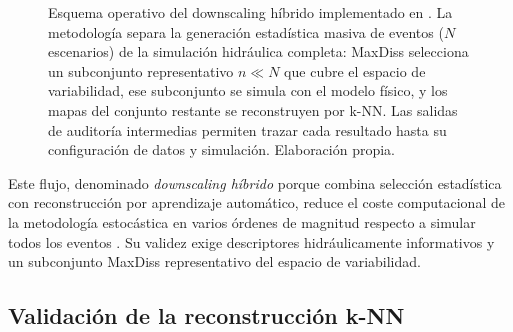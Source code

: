 \begin{figure}[!htbp]
{
}
\caption{Esquema operativo del downscaling híbrido implementado en \hydra. La metodología separa la generación estadística masiva de eventos ($N$ escenarios) de la simulación hidráulica completa: MaxDiss selecciona un subconjunto representativo $n \ll N$ que cubre el espacio de variabilidad, ese subconjunto se simula con el modelo físico, y los mapas del conjunto restante se reconstruyen por k-NN. Las salidas de auditoría intermedias permiten trazar cada resultado hasta su configuración de datos y simulación. Elaboración propia.}
\label{fig:maxdiss_downscaling}
\end{figure}

Este flujo, denominado \emph{downscaling híbrido} porque combina selección estadística con reconstrucción por aprendizaje automático, reduce el coste computacional de la metodología estocástica en varios órdenes de magnitud respecto a simular todos los eventos \parencite{deljesus2024downscaling}. Su validez exige descriptores hidráulicamente informativos y un subconjunto MaxDiss representativo del espacio de variabilidad.

\subsection{Validación de la reconstrucción k-NN}
\label{sec:validacion_knn}

